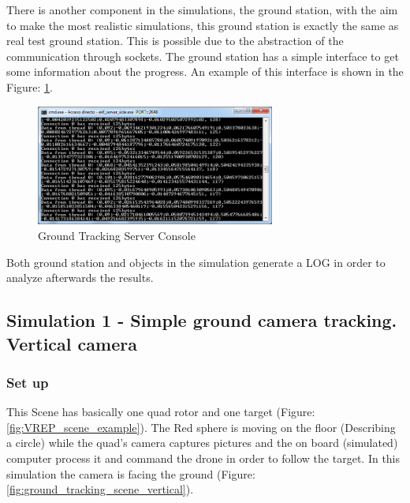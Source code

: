 There is another component in the simulations, the ground station, with the aim to make the most realistic simulations, this ground station is exactly the same as real test ground station. This is possible due to the abstraction of the communication through sockets. The ground station has a simple interface to get some information about the progress. An example of this interface is shown in the Figure: \ref{fig:Ground_Tracking_Server_Console}.

\begin{figure}[ht]
	\includegraphics[width=0.7\textwidth,natwidth=677,natheight=342]{../Images/c3/ground_tracking_server_console.png}
	\caption{Ground Tracking Server Console}
	\label{fig:Ground_Tracking_Server_Console}
\end{figure}

Both ground station and objects in the simulation generate a LOG in order to analyze afterwards the results.

\subsection{Simulation 1 - Simple ground camera tracking. Vertical camera}
\subsubsection{Set up}
This Scene has basically one quad rotor and one target (Figure: \ref{fig:VREP_scene_example}). The Red sphere is moving on the floor (Describing a circle) while the quad's camera captures pictures and the on board (simulated) computer process it and command the drone in order to follow the target. In this simulation the camera is facing the ground (Figure: \ref{fig:ground_tracking_scene_vertical}).

